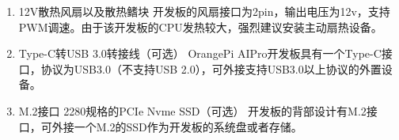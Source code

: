 \begin{enumerate}
\item
  12V散热风扇以及散热鳍块
  开发板的风扇接口为2pin，输出电压为12v，支持PWM调速。由于该开发板的CPU发热较大，强烈建议安装主动扇热设备。
\item
  Type-C转USB 3.0转接线（可选） OrangePi
  AIPro开发板具有一个Type-C接口，协议为USB3.0（不支持USB
  2.0），可外接支持USB3.0以上协议的外置设备。
\item
  M.2接口 2280规格的PCIe Nvme SSD（可选）
  开发板的背部设计有M.2接口，可外接一个M.2的SSD作为开发板的系统盘或者存储。

\end{enumerate}
